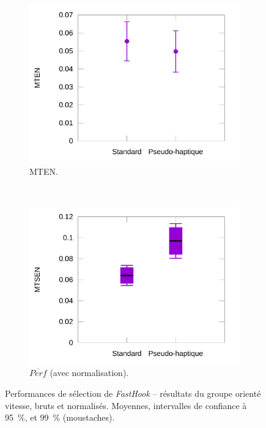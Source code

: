 \begin{figure}[!htb]
\begin{subfigure}[t]{0.49\textwidth}
			\includegraphics[width=\textwidth]{figures/ch5/phSpNormErrors}
			\caption{MTEN.}
			\label{fig:phSpNormErrors}
		\end{subfigure}
				~
		\begin{subfigure}[t]{0.49\textwidth}
			\centering
			\includegraphics[width=\textwidth]{figures/ch5/phSpNormProducts}
			\caption{$\overline{Perf}$ (avec normalisation).}
			\label{fig:phSpNormProducts}
		\end{subfigure}
		\caption[\emph{FastHook} -- résultats II]{Performances de sélection de \emph{FastHook} -- résultats du groupe orienté vitesse, bruts et normalisés. Moyennes, intervalles de confiance à 95~\%{}, et 99~\%{} (moustaches).}
		\label{fig:fastHookSpRes}
	\end{figure}
	
